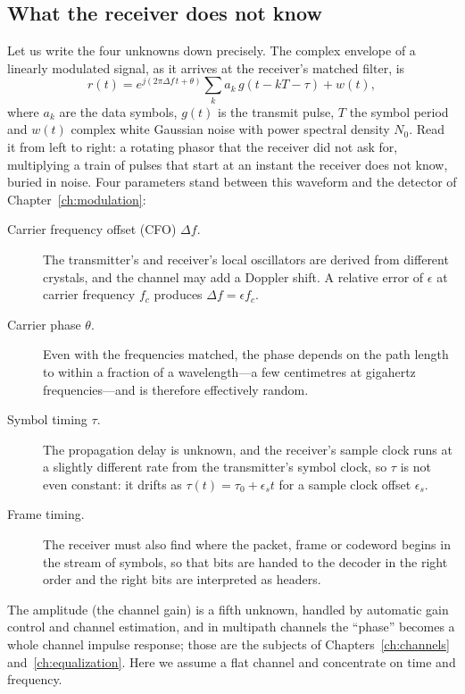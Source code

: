 

\subsection{What the receiver does not know}

Let us write the four unknowns down precisely. The complex envelope of a linearly modulated
signal, as it arrives at the receiver's matched filter, is
\begin{equation}
r(t)=e^{j(2\pi\Delta f\,t+\theta)}\sum_k a_k\,g(t-kT-\tau)+w(t),
\label{eq:ch10:model}
\end{equation}
where $a_k$ are the data symbols, $g(t)$ is the transmit pulse, $T$ the symbol period and $w(t)$
complex white Gaussian noise with power spectral density $N_0$. Read it from left to right: a
rotating phasor that the receiver did not ask for, multiplying a train of pulses that start at
an instant the receiver does not know, buried in noise. Four parameters stand between this
waveform and the detector of Chapter~\ref{ch:modulation}:
\begin{description}
\item[Carrier frequency offset (CFO) $\Delta f$.] The transmitter's and receiver's local
oscillators are derived from different crystals, and the channel may add a Doppler shift. A
relative error of $\epsilon$ at carrier frequency $f_c$ produces $\Delta f=\epsilon f_c$.
\item[Carrier phase $\theta$.] Even with the frequencies matched, the phase depends on the
path length to within a fraction of a wavelength---a few centimetres at gigahertz frequencies---and
is therefore effectively random.
\item[Symbol timing $\tau$.] The propagation delay is unknown, and the receiver's sample clock
runs at a slightly different rate from the transmitter's symbol clock, so $\tau$ is not even
constant: it drifts as $\tau(t)=\tau_0+\epsilon_s t$ for a sample clock offset $\epsilon_s$.
\item[Frame timing.] The receiver must also find where the packet, frame or codeword begins in the
stream of symbols, so that bits are handed to the decoder in the right order and the right
bits are interpreted as headers.
\end{description}
The amplitude (the channel gain) is a fifth unknown, handled by automatic gain control and channel
estimation, and in multipath channels the ``phase'' becomes a whole channel impulse response; those
are the subjects of Chapters~\ref{ch:channels} and~\ref{ch:equalization}. Here we assume a flat
channel and concentrate on time and frequency.

